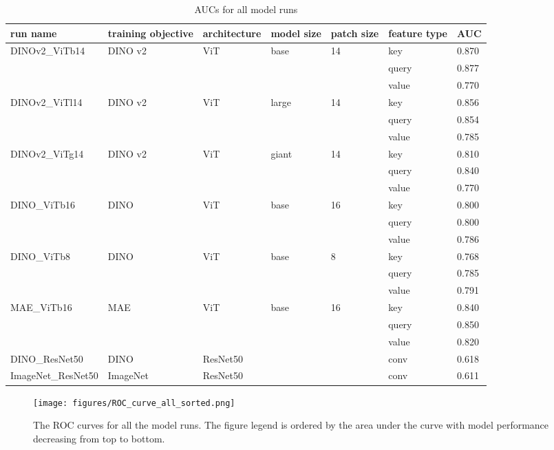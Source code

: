 \documentclass{article}
\begin{document}
\begin{table}[h]
\caption{AUCs for all model runs}
\label{tab:all_runs_roc}
    \centering
\def\arraystretch{1.9}
\begin{tabular}{|p{3cm}||p{1.4cm}|p{1.7cm}|p{}|p{1cm}|p{1cm}|p{1cm}| }
 \hline
  run name & training objective  & architecture & model size & patch size & feature type & AUC \\
 \hline
 DINOv2\_ViTb14 & DINO v2& ViT & base & 14 & key & 0.870\\
  & & &  &  & query & 0.877\\
  & & &  &  & value & 0.770\\
 \hline
 DINOv2\_ViTl14 & DINO v2& ViT & large & 14 & key & 0.856\\
  & & &  &  & query & 0.854\\
  & & &  &  & value &0.785\\
 \hline
 DINOv2\_ViTg14 & DINO v2& ViT & giant & 14 & key & 0.810\\
  & & &  &  & query & 0.840\\
  & & &  &  & value & 0.770\\
 \hline
 DINO\_ViTb16 & DINO & ViT & base & 16 & key & 0.800\\
  & & &  &  & query & 0.800\\
  & & &  &  & value & 0.786\\
 \hline
 DINO\_ViTb8 & DINO & ViT & base & 8 & key & 0.768\\
  & & &  &  & query & 0.785\\
  & & &  &  & value & 0.791\\
 \hline
 MAE\_ViTb16 & MAE & ViT & base & 16 & key & 0.840\\
  & & &  &  & query & 0.850\\
  & & &  &  & value &0.820\\
 \hline
 DINO\_ResNet50 & DINO & ResNet50 & & & conv & 0.618\\
 \hline
 ImageNet\_ResNet50 & ImageNet & ResNet50 &  &  & conv & 0.611\\
 \hline
\end{tabular}
    \centering
\end{table}
\vspace*{2mm}


\begin{figure}[ht]
\begin{center}
\texttt{[image: figures/ROC\_curve\_all\_sorted.png]}
\end{center}
\caption{ The ROC curves for all the model runs. The figure legend is ordered by the area under the curve with model performance decreasing from top to bottom.} %
\label{fig:object_centric_supp}
\end{figure}
\end{document}
